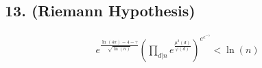 \subsection{13. (Riemann Hypothesis)}

\begin{align}
      e^{\frac{\ln(4 \pi)-4-\gamma}{\sqrt{
      \ln(n)}}}\left(\prod_{d|n}e^{\frac{
      \mu^2(d)}{\varphi(d)}}\right)^{e^{e^{
      -\gamma}}}< \ln(n)
\end{align}
